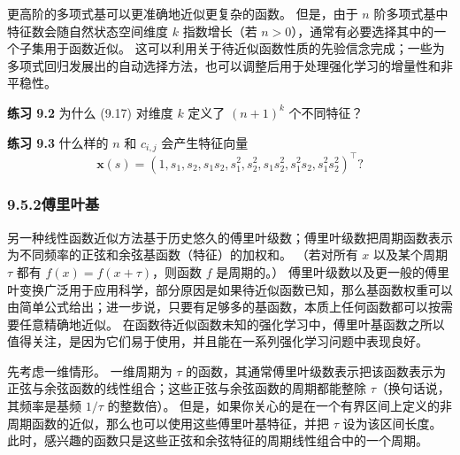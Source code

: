 \documentclass[UTF8, 12pt, fontset=fandol, oneside]{ctexart}
\begin{document}
\begin{center}
\end{center}

更高阶的多项式基可以更准确地近似更复杂的函数。
但是，由于 $n$ 阶多项式基中特征数会随自然状态空间维度 $k$ 指数增长（若 $n>0$），通常有必要选择其中的一个子集用于函数近似。
这可以利用关于待近似函数性质的先验信念完成；一些为多项式回归发展出的自动选择方法，也可以调整后用于处理强化学习的增量性和非平稳性。

\noindent\textbf{练习 9.2}
为什么 (9.17) 对维度 $k$ 定义了 $(n+1)^k$ 个不同特征？

\noindent\textbf{练习 9.3}
什么样的 $n$ 和 $c_{i,j}$ 会产生特征向量
\[
\mathbf{x}(s)=(1,s_1,s_2,s_1s_2,s_1^2,s_2^2,s_1s_2^2,s_1^2s_2,s_1^2s_2^2)^\top?
\]

\subsubsection*{9.5.2\quad 傅里叶基}

另一种线性函数近似方法基于历史悠久的傅里叶级数；傅里叶级数把周期函数表示为不同频率的正弦和余弦基函数（特征）的加权和。
（若对所有 $x$ 以及某个周期 $\tau$ 都有 $f(x)=f(x+\tau)$，则函数 $f$ 是周期的。）
傅里叶级数以及更一般的傅里叶变换广泛用于应用科学，部分原因是如果待近似函数已知，那么基函数权重可以由简单公式给出；进一步说，只要有足够多的基函数，本质上任何函数都可以按需要任意精确地近似。
在函数待近似函数未知的强化学习中，傅里叶基函数之所以值得关注，是因为它们易于使用，并且能在一系列强化学习问题中表现良好。

先考虑一维情形。
一维周期为 $\tau$ 的函数，其通常傅里叶级数表示把该函数表示为正弦与余弦函数的线性组合；这些正弦与余弦函数的周期都能整除 $\tau$（换句话说，其频率是基频 $1/\tau$ 的整数倍）。
但是，如果你关心的是在一个有界区间上定义的非周期函数的近似，那么也可以使用这些傅里叶基特征，并把 $\tau$ 设为该区间长度。
此时，感兴趣的函数只是这些正弦和余弦特征的周期线性组合中的一个周期。
\end{document}
